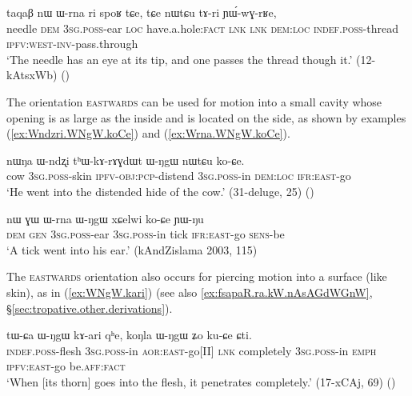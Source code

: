 \begin{exe}
\ex \label{ex:taqaB.Wrna.YWwGrRe}
\gll taqaβ nɯ ɯ-rna ri spoʁ tɕe, tɕe nɯtɕu tɤ-ri ɲɯ́-wɣ-rʁe, \\
needle \textsc{dem} \textsc{3sg}.\textsc{poss}-ear \textsc{loc} have.a.hole:\textsc{fact} \textsc{lnk} \textsc{lnk} \textsc{dem}:\textsc{loc} \textsc{indef}.\textsc{poss}-thread \textsc{ipfv}:\textsc{west}-\textsc{inv}-pass.through \\
\glt `The needle has an eye at its tip, and one passes the thread though it.' (12-kAtsxWb) ()
\end{exe}

The orientation \textsc{eastwards} can be used for motion into a small cavity whose opening is as large as the inside and is located on the side, as shown by examples (\ref{ex:Wndzri.WNgW.koCe}) and (\ref{ex:Wrna.WNgW.koCe}).

\begin{exe}
\ex \label{ex:Wndzri.WNgW.koCe}
\gll nɯŋa ɯ-ndʐi tʰɯ-kɤ-rɤɣdɯt ɯ-ŋgɯ nɯtɕu ko-ɕe. \\
cow \textsc{3sg}.\textsc{poss}-skin \textsc{ipfv}-\textsc{obj}:\textsc{pcp}-distend \textsc{3sg}.\textsc{poss}-in \textsc{dem}:\textsc{loc} \textsc{ifr}:\textsc{east}-go \\
\glt `He went into the distended hide of the cow.' (31-deluge, 25)
()
\end{exe}

\begin{exe}
\ex \label{ex:Wrna.WNgW.koCe}
\gll nɯ ɣɯ ɯ-rna ɯ-ŋgɯ xɕelwi ko-ɕe ɲɯ-ŋu \\
\textsc{dem} \textsc{gen} \textsc{3sg}.\textsc{poss}-ear \textsc{3sg}.\textsc{poss}-in tick \textsc{ifr}:\textsc{east}-go \textsc{sens}-be \\
\glt `A tick went into his ear.' (kAndZislama 2003, 115)
\end{exe}

The \textsc{eastwards} orientation also occurs for piercing motion into a surface (like skin), as in (\ref{ex:WNgW.kari}) (see also \ref{ex:fsapaR.ra.kW.nAsAGdWGnW}, §\ref{sec:tropative.other.derivations}).

\begin{exe}
\ex \label{ex:WNgW.kari}
\gll  tɯ-ɕa ɯ-ŋgɯ kɤ-ari qʰe, koŋla ɯ-ŋgɯ ʑo ku-ɕe ɕti. \\
\textsc{indef}.\textsc{poss}-flesh \textsc{3sg}.\textsc{poss}-in \textsc{aor}:\textsc{east}-go[II] \textsc{lnk} completely \textsc{3sg}.\textsc{poss}-in \textsc{emph} \textsc{ipfv}:\textsc{east}-go be.\textsc{aff}:\textsc{fact} \\
\glt `When [its thorn] goes into the flesh, it penetrates completely.' (17-xCAj, 69)
()
 \end{exe} 

